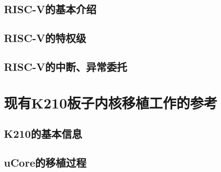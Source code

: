 \subsection{RISC-V的基本介绍}

\subsection{RISC-V的特权级}

\subsection{RISC-V的中断、异常委托}

\section{现有K210板子内核移植工作的参考}

\subsection{K210的基本信息}

\subsection{uCore的移植过程}


